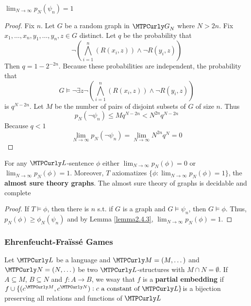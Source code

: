 \documentclass[11pt]{article}
\begin{document}
\begin{lemma}[]
\label{lemma2.4.3}
\(\lim_{N\to\infty}p_N(\psi_n)=1\)
\end{lemma}

\begin{proof}
Fix \(n\). Let \(G\) be a random graph in \(\calg_N\) where \(N>2n\). Fix 
\(x_1,\dots,x_n,y_1,\dots,y_n,z\in G\) distinct. Let \(q\) be the
probability that 
\begin{equation*}
\neg\left(
\displaystyle\bigwedge_{i=1}^n(R(x_i,z))\wedge\neg R(y_i,z)
\right)
\end{equation*}
Then \(q=1-2^{-2n}\). Because these probabilities are independent, the
probability that 
\begin{equation*}
G\models\neg\exists z\neg\left(
\displaystyle\bigwedge_{i=1}^n(R(x_i,z))\wedge\neg R(y_i,z)
\right)
\end{equation*}
is \(q^{N-2n}\). Let \(M\) be the number of pairs of disjoint subsets of \(G\)
of size \(n\). Thus
\begin{equation*}
p_N(\neg\psi_n)\le Mq^{N-2n}<N^{2n}q^{N-2n}
\end{equation*}
Because \(q<1\)
\begin{equation*}
\lim_{N\to\infty}p_N(\neg\psi_n)=\lim_{N\to\infty}N^{2n}q^N=0
\end{equation*}
\end{proof}

\begin{theorem}
\label{thm2.4.4}
For any \(\call\)-sentence \(\phi\) either \(\lim_{N\to\infty}p_N(\phi)=0\) or 
\(\lim_{N\to\infty}p_N(\phi)=1\). Moreover, \(T\) axiomatizes
\(\{\phi:\lim_{N\to\infty}p_N(\phi)=1\}\), the \textbf{almost sure theory graphs}. The
almost sure theory of graphs is decidable and complete
\end{theorem}

\begin{proof}
If \(T\models\phi\), then there is \(n\) s.t. if \(G\) is a graph and
\(G\models\psi_n\), then \(G\models\phi\). Thus,
\(p_N(\phi)\ge\phi_N(\psi_n)\) and by Lemma \ref{lemma2.4.3}, \(\lim_{N\to\infty}p_N(\phi)=1\).
\end{proof}

\subsubsection{Ehrenfeucht-Fraïssé Games}
\label{sec:org4e2e149}
Let \(\call\) be a language and \(\calm=(M,\dots)\) and \(\caln=(N,\dots)\)
be two \(\call\)-structures with \(M\cap N=\emptyset\). If \(A\subseteq M\),
\(B\subseteq N\) and \(f:A\to B\), we wsay that \(f\) is a \textbf{partial embedding}
if \(f\cup\{(c^\calm,c^\caln):c\text{ a constant of }\call\}\)is a bijection
preserving all relations and functions of \(\call\)
\end{document}
